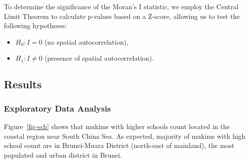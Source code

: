 \documentclass[
  12pt,
]{article}
\providecommand{\tightlist}{%
  \setlength{\itemsep}{0pt}\setlength{\parskip}{0pt}}
\begin{document}
To determine the significance of the Moran's I statistic, we employ the
Central Limit Theorem to calculate p-values based on a Z-score, allowing
us to test the following hypotheses:

\begin{itemize}
\tightlist
\item
  \(H_0: I = 0\) (no spatial autocorrelation),
\item
  \(H_1: I \neq 0\) (presence of spatial autocorrelation).
\end{itemize}

\subsection{Results}\label{sec-results}

\subsubsection{Exploratory Data
Analysis}\label{exploratory-data-analysis}

Figure~\ref{fig-sch} shows that mukims with higher schools count located
in the coastal region near South China Sea. As expected, majority of
mukims with high school count are in Brunei-Muara District (north-east
of mainland), the most populated and urban district in Brunei.
\end{document}
